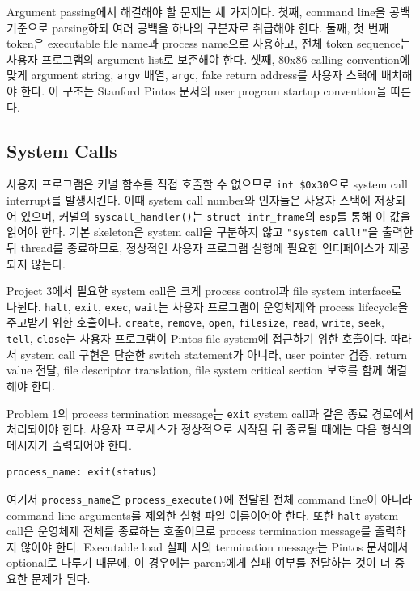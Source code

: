 \documentclass[conference]{IEEEtran}
\newcommand{\codefont}[1]{\texttt{\color{darkmagenta}#1}}
\begin{document}
Argument passing에서 해결해야 할 문제는 세 가지이다. 첫째, command line을 공백 기준으로 parsing하되 여러 공백을 하나의 구분자로 취급해야 한다. 둘째, 첫 번째 token은 executable file name과 process name으로 사용하고, 전체 token sequence는 사용자 프로그램의 argument list로 보존해야 한다. 셋째, 80x86 calling convention에 맞게 argument string, \codefont{argv} 배열, \codefont{argc}, fake return address를 사용자 스택에 배치해야 한다. 이 구조는 Stanford Pintos 문서의 user program startup convention을 따른다.

\subsection{System Calls}

사용자 프로그램은 커널 함수를 직접 호출할 수 없으므로 \codefont{int \$0x30}으로 system call interrupt를 발생시킨다. 이때 system call number와 인자들은 사용자 스택에 저장되어 있으며, 커널의 \codefont{syscall\_handler()}는 \codefont{struct intr\_frame}의 \codefont{esp}를 통해 이 값을 읽어야 한다. 기본 skeleton은 system call을 구분하지 않고 \codefont{"system call!"}을 출력한 뒤 thread를 종료하므로, 정상적인 사용자 프로그램 실행에 필요한 인터페이스가 제공되지 않는다.

Project 3에서 필요한 system call은 크게 process control과 file system interface로 나뉜다. \codefont{halt}, \codefont{exit}, \codefont{exec}, \codefont{wait}는 사용자 프로그램이 운영체제와 process lifecycle을 주고받기 위한 호출이다. \codefont{create}, \codefont{remove}, \codefont{open}, \codefont{filesize}, \codefont{read}, \codefont{write}, \codefont{seek}, \codefont{tell}, \codefont{close}는 사용자 프로그램이 Pintos file system에 접근하기 위한 호출이다. 따라서 system call 구현은 단순한 switch statement가 아니라, user pointer 검증, return value 전달, file descriptor translation, file system critical section 보호를 함께 해결해야 한다.

Problem 1의 process termination message는 \codefont{exit} system call과 같은 종료 경로에서 처리되어야 한다. 사용자 프로세스가 정상적으로 시작된 뒤 종료될 때에는 다음 형식의 메시지가 출력되어야 한다.

\begin{lstlisting}[numbers=none]
process_name: exit(status)
\end{lstlisting}

여기서 \codefont{process\_name}은 \codefont{process\_execute()}에 전달된 전체 command line이 아니라 command-line arguments를 제외한 실행 파일 이름이어야 한다. 또한 \codefont{halt} system call은 운영체제 전체를 종료하는 호출이므로 process termination message를 출력하지 않아야 한다. Executable load 실패 시의 termination message는 Pintos 문서에서 optional로 다루기 때문에, 이 경우에는 parent에게 실패 여부를 전달하는 것이 더 중요한 문제가 된다.
\end{document}
